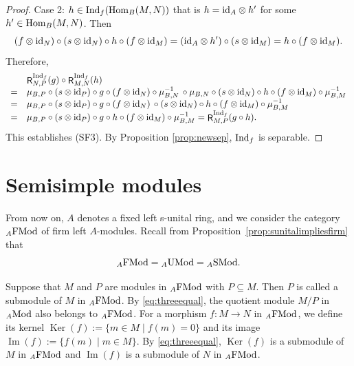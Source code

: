 \documentclass[12pt]{amsart}
\theoremstyle{definition}
\newcommand{\Mod}{{\rm Mod}}
\newcommand{\FMod}{{\rm FMod}}
\newcommand{\SMod}{{\rm SMod}}
\newcommand{\UMod}{{\rm UMod}}
\newcommand{\id}{{\rm id}}
\newcommand{\Hom}{{\rm Hom}}
\newcommand{\Ind}{{\rm Ind}}
\DeclareMathOperator{\Ker}{Ker}
\DeclareMathOperator{\Ima}{Im}
\DeclareMathOperator{\R}{\mathsf R}
\begin{document}
\begin{proof}
Case 2: $h \in \Ind_f(\Hom_B(M,N))$
that is $h = \id_A \otimes h'$ for 
some $h' \in \Hom_B(M,N)$. Then
\[
(f \otimes \id_N) \circ
(s \otimes \id_N) \circ h \circ 
(f \otimes \id_M)  = 
(\id_A \otimes h') \circ 
(s \otimes \id_M) = 
h \circ (f \otimes \id_M).
\]
Therefore,
{\small \[
\begin{array}{cl}
 & \R_{N,P}^{\Ind_f}(g) \circ
\R_{M,N}^{\Ind_f}(h) \\
=& \mu_{B,P} \circ (s \otimes \id_P)
\circ g \circ (f \otimes \id_N)
\circ \mu_{B,N}^{-1} \, \circ 
\mu_{B,N} \circ (s \otimes \id_N)
\circ h \circ (f \otimes \id_M) 
\circ \mu_{B,M}^{-1} \\
=& \mu_{B,P}  \circ  (s \otimes \id_P)
\circ g \circ 
(f \otimes \id_N) \, \circ 
(s \otimes \id_N)  \circ h \circ
(f \otimes \id_M)  \circ \mu_{B,M}^{-1} \\
=& \mu_{B,P} \circ (s \otimes \id_P) 
\circ g \circ h \circ 
(f \otimes \id_M) \circ \mu_{B,M}^{-1} 
= \R_{M,P}^{\Ind_f}(g \circ h).
\end{array}
\]}
This establishes (SF3).
By Proposition \ref{prop:newsep},
$\Ind_f$ is separable.
\end{proof}



\section{Semisimple modules}\label{sec:semisimplemodules}



From now on, $A$ denotes 
a fixed left s-unital ring, and we 
consider the category ${}_A \FMod$
of firm left $A$-modules. Recall from 
Proposition~\ref{prop:sunitalimpliesfirm} that 
\begin{equation}\label{eq:threeequal}
{}_A \FMod = 
{}_A \UMod = {}_A \SMod.
\end{equation}

Suppose that $M$ and $P$ are modules 
in ${}_A \FMod$
with $P \subseteq M$. 
Then $P$ is called 
a submodule of $M$ in ${}_A \FMod$. 
By \eqref{eq:threeequal}, the  
quotient module $M/P$ in ${}_A \Mod$  
also belongs to ${}_A \FMod$.
For a morphism $f : M \to N$ 
in ${}_A \FMod$, we define its kernel 
$\Ker(f) := \{ m \in M \mid f(m) = 0 \}$
and its image $\Ima(f) := \{ f(m) \mid m \in M \}$.
By \eqref{eq:threeequal},
$\Ker(f)$ is a submodule of $M$ 
in ${}_A\FMod$ 
and $\Ima(f)$ is a submodule of $N$ in ${}_A\FMod$.
\end{document}
